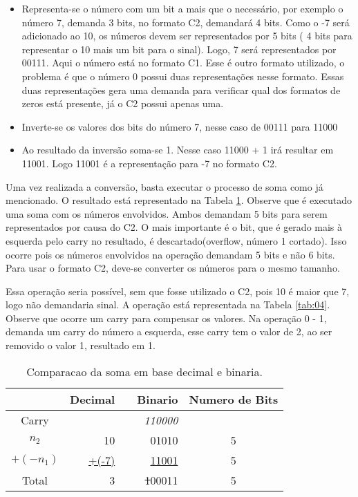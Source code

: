 \documentclass[12pt]{article}
\begin{document}
\begin{itemize}
	\item Representa-se o número com um bit a mais que o necessário, por
exemplo o número 7, demanda 3 bits, no formato C2, demandará 4 bits. Como o -7
será adicionado ao 10, os números devem ser representados por 5 bits ( 4 bits
para representar o 10 mais um bit para o sinal). Logo, 7 será representados por
00111. Aqui o número está no formato C1. Esse é outro formato utilizado, o
problema é que o número 0 possui duas representações nesse formato. Essas duas
representações gera uma demanda para verificar qual dos formatos de zeros está
presente, já o C2 possui apenas uma.
    \item Inverte-se os valores dos bits do número 7, nesse caso de 00111 para
11000
	\item Ao resultado da inversão soma-se 1. Nesse caso 11000 + 1 irá
resultar em 11001. Logo 11001 é a representação para -7 no formato C2.
\end{itemize}

Uma vez realizada a conversão, basta executar o processo de soma como já
mencionado. O resultado está representado na Tabela \ref{tab:03}. Observe que é
executado uma soma com os números envolvidos. Ambos demandam 5 bits para serem
representados por causa do C2. O mais importante é o bit, que é gerado mais à
esquerda pelo carry no resultado, é descartado(overflow, número 1 cortado). Isso
ocorre pois os números envolvidos na operação demandam 5 bits e não 6 bits. Para
usar o formato C2, deve-se converter os números para o mesmo tamanho.

Essa operação seria possível, sem que fosse utilizado o C2, pois 10 é maior que
7, logo não demandaria sinal. A operação está representada na Tabela
\ref{tab:04}. Observe que ocorre um carry para compensar os valores. Na operação
0 - 1, demanda um carry do número a esquerda, esse carry tem o valor de 2, ao
ser removido o valor 1, resultado em 1.

\begin{table}[ht]
	\centering
    \caption{Comparacao da soma em base decimal e binaria.}
    \begin{tabular}{crrrc}
    \hline
    	  & Decimal & & Binario & Numero de Bits \\
    \hline      
    Carry & 	& & \textit{110000} & \\
    $n_2$ & 10	& & 01010 & 5 \\
    $+(-n_1)$ & \underline{+(-7)} & & \underline{11001} & 5 \\
    Total & 3	& & \sout{1}00011 & 5 \\
    \hline
	\end{tabular}
    \label{tab:03}
\end{table}
\end{document}
